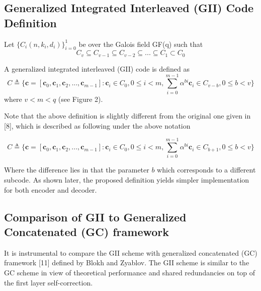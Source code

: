 \documentclass[fontsize=12pt]{article}
\begin{document}
\subsection{Generalized Integrated Interleaved (GII) Code Definition}
Let $\{\mathit{C}_i(n,k_i,d_i)\}_{i=0}^1$ be over the Galois field GF(q) such
that
\begin{equation}
\mathit{C}_v \subseteq \mathit{C}_{v - 1} \subseteq \mathit{C}_{v - 2} \subseteq . . . \subseteq \mathit{C}_1 \subset \mathit{C}_0
\end{equation}
 
 A generalized integrated interleaved (GII) code is defined as
 \begin{equation}
\mathit{C}
\triangleq \Big\{
\mathbf{c} = [\mathbf{c} _0, \mathbf{c} _1, \mathbf{c}_2, . . . , \mathbf{c} _{m-1}] : \mathbf{c}_i \in \mathit{C}_0, 0 \leq i < m,
\sum^{m-1}_{i=0}\alpha^{bi} \mathbf{c}_i \in \mathit{C}_{v - b}, 0 \leq b < v \Big\}
\end{equation}
where $ v < m < q$ (see Figure 2).
 
 Note that the above
definition is slightly different from the original one given
in [8], which is described as following under the above
notation

 \begin{equation}
\mathit{C}
\triangleq \Big\{
\mathbf{c} = [\mathbf{c} _0, \mathbf{c} _1, \mathbf{c}_2, . . . , \mathbf{c} _{m-1}] : \mathbf{c}_i \in \mathit{C}_0, 0 \leq i < m,
\sum^{m-1}_{i=0}\alpha^{bi} \mathbf{c}_i \in \mathit{C}_{b+1}, 0 \leq b < v \Big\}
\end{equation}

Where the difference lies in that the parameter $b$ which corresponds
to a different subcode. As shown later, the proposed definition
yields simpler implementation for both encoder and decoder.

 \subsection{Comparison of GII to Generalized Concatenated (GC) framework}
 It is instrumental to compare the GII scheme with
generalized concatenated (GC) framework [11] defined by
Blokh and Zyablov. The GII scheme is similar to the
GC scheme in view of theoretical performance and shared
redundancies on top of the first layer self-correction.  
\end{document}
